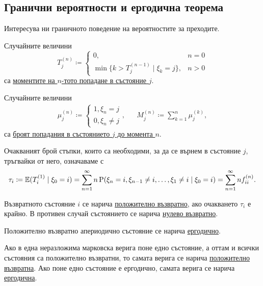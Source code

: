 \documentclass[numbers=endperiod, DIV=15, bibliography=totocnumbered]{scrartcl}
\begin{document}
\subsection{Гранични вероятности и ергодична теорема}

Интересува ни граничното поведение на вероятностите за преходите.

\begin{definition}
  Случайните величини
  \begin{displaymath}
    T_j^{(n)}
    \coloneqq
    \begin{cases}
      0, &n = 0 \\
      \min \{ k > T_j^{(n-1)} \mid \xi_k = j \}, &n > 0
    \end{cases}
  \end{displaymath}
  са \uline{моментите на $n$-тото попадане в състояние $j$}.

  Случайните величини
  \begin{align*}
    \mu_j^{(n)}
    \coloneqq
    \begin{cases}
      1, \xi_n = j \\
      0, \xi_n \neq j
    \end{cases},
    &&
    M_j^{(n)}
    \coloneqq
    \sum_{k=1}^n \mu_j^{(k)},
  \end{align*}
  са \uline{броят попадания в състоянието $j$ до момента $n$}.

  Очакваният брой стъпки, които са необходими, за да се върнем в състояние $j$, тръгвайки от него, означаваме с
  \begin{displaymath}
    \tau_i
    \coloneqq
    \mathbb{E}(T_i^{(1)} \mid \xi_0 = i)
    =
    \sum_{n=1}^\infty n \operatorname{P}(\xi_n = i, \xi_{n-1} \neq i, \ldots, \xi_1 \neq i \mid \xi_0 = i)
    =
    \sum_{n=1}^\infty n f^{(n)}_{ii}.
  \end{displaymath}
\end{definition}

\begin{definition}
  Възвратното състояние $i$ се нарича \uline{положително възвратно}, ако очакването $\tau_i$ е крайно. В противен случай състоянието се нарича \uline{нулево възвратно}.

  Положително възвратно апериодично състояние се нарича \uline{ергодично}.

  Ако в една неразложима марковска верига поне едно състояние, а оттам и всички състояния са положително възвратни, то самата верига се нарича \uline{положително възвратна}. Ако поне едно състояние е ергодично, самата верига се нарича \uline{ергодична}.
\end{definition}
\end{document}

